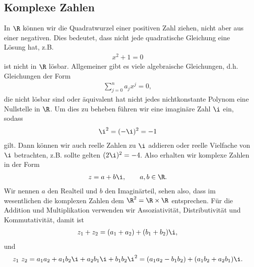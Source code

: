 \documentclass[letterpaper,10pt,english]{jupyterBook}
\begin{document}
\subsection{Komplexe Zahlen}
\label{\detokenize{grundlagen/zahlensysteme:komplexe-zahlen}}
In \(\R\) können wir die Quadratwurzel einer positiven Zahl ziehen, nicht aber aus einer negativen. Dies bedeutet, dass nicht jede quadratische Gleichung eine Lösung hat, z.B.
\begin{equation*}
\begin{split} x^2 +1 = 0\end{split}
\end{equation*}
ist nicht in \(\R\) lösbar. Allgemeiner gibt es viele algebraische Gleichungen, d.h. Gleichungen der Form
\begin{equation*}
\begin{split} \sum_{j=0}^n a_j x^j = 0,\end{split}
\end{equation*}
die nicht lösbar sind oder äquivalent hat nicht jedes nichtkonstante Polynom eine Nullstelle in \(\R\). Um dies zu beheben führen wir eine imaginäre Zahl \(\i\) ein, sodass
\begin{equation*}
\begin{split} \i^2 = (-\i)^2 = -1\end{split}
\end{equation*}
gilt. Dann können wir auch reelle Zahlen zu \(\i\) addieren oder reelle Vielfache von \(\i\) betrachten, z.B. sollte gelten \((2\i)^2=-4\). Also erhalten wir komplexe Zahlen in der Form
\begin{equation*}
\begin{split} z = a + b \i, \qquad a, b \in \R.\end{split}
\end{equation*}
Wir nennen \(a\) den Realteil und \(b\) den Imaginärteil, sehen also, dass im wesentlichen die komplexen Zahlen dem \(\R^2 = \R \times \R\) entsprechen.
Für die Addition und Multiplikation verwenden wir Assoziativität, Distributivität und Kommutativität, damit ist
\begin{equation*}
\begin{split} z_1+z_2 = (a_1+a_2) + (b_1+b_2)\i,\end{split}
\end{equation*}
und
\begin{equation*}
\begin{split} z_1 ~z_2 = a_1 a_2 + a_1 b_2 \i + a_2 b_1 \i + b_1 b_2 \i^2 = (a_1 a_2 - b_1 b_2) + ( a_1 b_2   + a_2 b_1) \i .\end{split}
\end{equation*}
\end{document}
